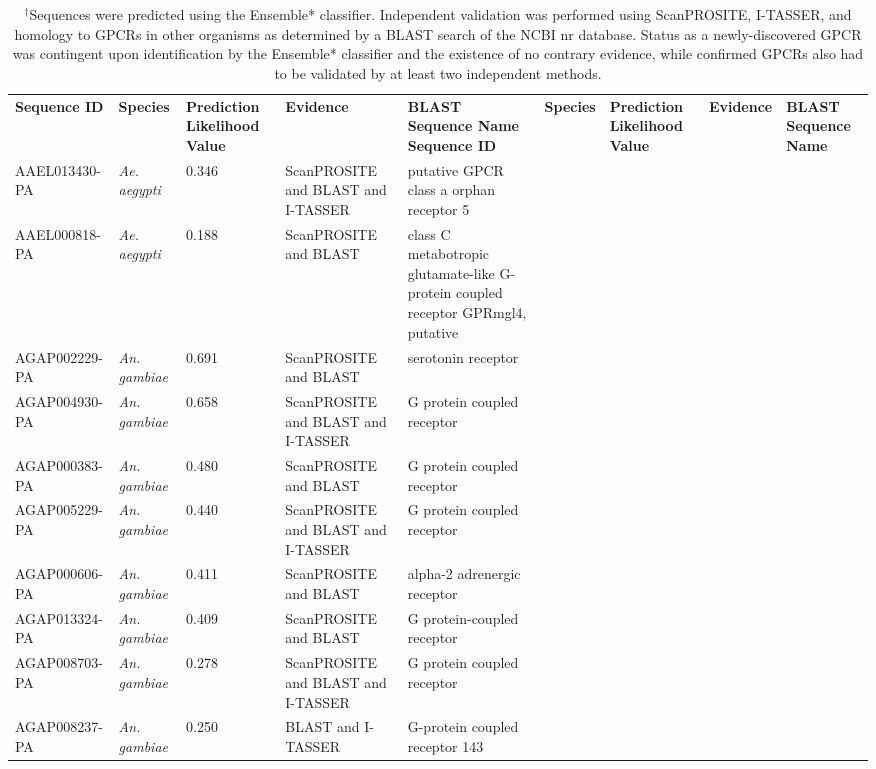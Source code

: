 \begin{longtable}{| l | l | p{1.75cm} | p{3.5cm} | p{4cm} |}
\caption{\label{tab:novel-gpcrs} Newly-Discovered GPCRs Identified by Ensemble*$^{\dagger}$.} \\ \hline
\textbf{Sequence ID} & \textbf{Species} & \textbf{Prediction Likelihood Value} & \textbf{Evidence} & \textbf{BLAST Sequence Name}
\endfirsthead
\hline
\textbf{Sequence ID} & \textbf{Species} & \textbf{Prediction Likelihood Value} & \textbf{Evidence} & \textbf{BLAST Sequence Name} \endhead
\caption*{$^{\dagger}$Sequences were predicted using the Ensemble* classifier.  Independent validation was performed using ScanPROSITE, I-TASSER, and homology to GPCRs in other organisms as determined by a BLAST search of the NCBI nr database.  Status as a newly-discovered GPCR was contingent upon identification by the Ensemble* classifier and the existence of no contrary evidence, while confirmed GPCRs also had to be validated by at least two independent methods.}\\
\endlastfoot
\hline
    AAEL013430-PA & \emph{Ae. aegypti} & 0.346 & ScanPROSITE and BLAST and I-TASSER & putative GPCR class a orphan receptor 5 \\ \hline
    AAEL000818-PA & \emph{Ae. aegypti} & 0.188 & ScanPROSITE and BLAST & class C metabotropic glutamate-like G-protein coupled receptor GPRmgl4, putative \\ \hline
    AGAP002229-PA & \emph{An. gambiae} & 0.691 & ScanPROSITE and BLAST & serotonin receptor \\ \hline
    AGAP004930-PA & \emph{An. gambiae} & 0.658 & ScanPROSITE and BLAST and I-TASSER & G protein coupled receptor \\ \hline
    AGAP000383-PA & \emph{An. gambiae} & 0.480 & ScanPROSITE and BLAST & G protein coupled receptor \\ \hline
    AGAP005229-PA & \emph{An. gambiae} & 0.440 & ScanPROSITE and BLAST and I-TASSER & G protein coupled receptor \\ \hline
    AGAP000606-PA & \emph{An. gambiae} & 0.411 & ScanPROSITE and BLAST & alpha-2 adrenergic receptor \\ \hline
    AGAP013324-PA & \emph{An. gambiae} & 0.409 & ScanPROSITE and BLAST & G protein-coupled receptor \\ \hline
    AGAP008703-PA & \emph{An. gambiae} & 0.278 & ScanPROSITE and BLAST and I-TASSER & G protein coupled receptor \\ \hline
    AGAP008237-PA & \emph{An. gambiae} & 0.250 & BLAST and I-TASSER & G-protein coupled receptor 143 \\ \hline

\end{longtable}
